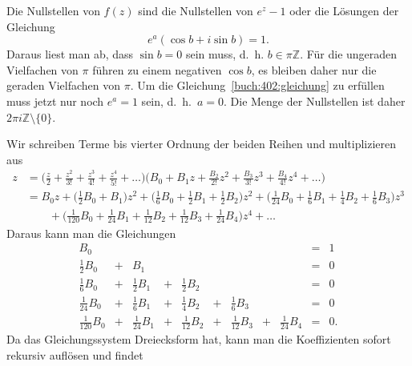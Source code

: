 \begin{loesung}
\begin{teilaufgaben}
\item
Die Nullstellen von $f(z)$ sind die Nullstellen von $e^z-1$ oder die
Lösungen der Gleichung
\begin{equation}
e^a(\cos b + i \sin b)
=
1.
\label{buch:402:gleichung}
\end{equation}
Daraus liest man ab, dass $\sin b=0$ sein muss,
d.~h. $b\in \pi\mathbb{Z}$.
Für die ungeraden Vielfachen von $\pi$ führen zu einem negativen $\cos b$,
es bleiben daher nur die geraden Vielfachen von $\pi$.
Um die Gleichung~\eqref{buch:402:gleichung} zu erfüllen muss jetzt nur noch
$e^a=1$ sein, d.~h.~$a=0$.
Die Menge der Nullstellen ist daher $2\pi i\mathbb{Z}\setminus\{0\}$.
\item
Wir schreiben Terme bis vierter Ordnung der beiden Reihen und
multiplizieren aus
\begin{align*}
z
&=
\biggl(
\frac{z}{2} + \frac{z^2}{3!} + \frac{z^3}{4!} + \frac{z^4}{5!} + \ldots
\biggr)
\biggl(
B_0 + B_1z + \frac{B_2}{2!}z^2 + \frac{B_3}{3!}z^3 + \frac{B_4}{4!}z^4 + \ldots
\biggr)
\\
&=
\textstyle
B_0z
+
\bigl(\frac12 B_0 + B_1\bigr) z^2
+
\bigl(\frac16 B_0 + \frac12 B_1 + \frac12 B_2\bigr)z^2
+
\bigl(\frac1{24} B_0 + \frac16 B_1 + \frac14 B_2 + \frac16 B_3\bigr)z^3
\\
&\qquad
\textstyle
+
\bigl(\frac1{120} B_0 + \frac1{24} B_1 + \frac1{12} B_2 + \frac1{12} B_3 + \frac1{24} B_4)z^4
+
\ldots
\end{align*}
Daraus kann man die Gleichungen
\[
\renewcommand{\arraystretch}{1.4}
\renewcommand{\arraycolsep}{2pt}
\begin{array}{rcrcrcrcrcl}
           B_0 & &               & &               & &               & &               &=& 1\phantom{.}\\
\frac1{2}  B_0 &+&           B_1 & &               & &               & &               &=& 0\phantom{.}\\
\frac1{6}  B_0 &+& \frac1{2} B_1 &+& \frac1{2} B_2 & &               & &               &=& 0\phantom{.}\\
\frac1{24} B_0 &+& \frac1{6} B_1 &+& \frac1{4} B_2 &+& \frac1{6} B_3 & &               &=& 0\phantom{.}\\
\frac1{120}B_0 &+& \frac1{24}B_1 &+& \frac1{12}B_2 &+& \frac1{12}B_3 &+& \frac1{24}B_4 &=& 0.
\end{array}
\]
Da das Gleichungssystem Dreiecksform hat, kann man die
Koeffizienten sofort rekursiv auflösen und findet

\end{teilaufgaben}
\end{loesung}
